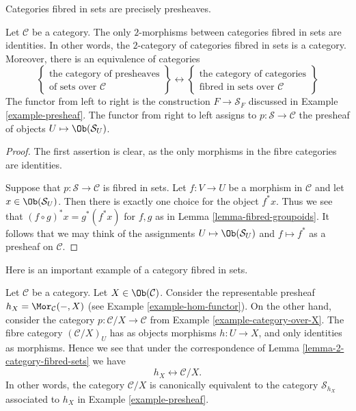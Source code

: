 \begin{lemma}
\label{lemma-2-category-fibred-sets}
\begin{slogan}
Categories fibred in sets are precisely presheaves.
\end{slogan}
Let $\mathcal{C}$ be a category.
The only $2$-morphisms between categories fibred in sets are identities.
In other words, the $2$-category of categories fibred in sets is a category.
Moreover, there is an equivalence of categories
$$
\left\{
\begin{matrix}
\text{the category of presheaves}\\
\text{of sets over }\mathcal{C}
\end{matrix}
\right\}
\leftrightarrow
\left\{
\begin{matrix}
\text{the category of categories}\\
\text{fibred in sets over }\mathcal{C}
\end{matrix}
\right\}
$$
The functor from left to right is the construction
$F \to \mathcal{S}_F$ discussed in
Example \ref{example-presheaf}.
The functor from right to left assigns to $p : \mathcal{S} \to \mathcal{C}$
the presheaf of objects $U \mapsto \Ob(\mathcal{S}_U)$.
\end{lemma}

\begin{proof}
The first assertion is clear, as the only morphisms in the fibre
categories are identities.

\medskip\noindent
Suppose that $p :
\mathcal{S} \to \mathcal{C}$ is fibred in sets. Let $f : V \to U$
be a morphism in $\mathcal{C}$ and let $x \in \Ob(\mathcal{S}_U)$.
Then there is exactly one choice for the object $f^\ast x$. Thus we see that
$(f \circ g)^\ast x = g^\ast(f^\ast x)$ for $f, g$ as in Lemma
\ref{lemma-fibred-groupoids}. It follows that we may think of the
assignments $U \mapsto \Ob(\mathcal{S}_U)$ and $f \mapsto f^\ast$
as a presheaf on $\mathcal{C}$.
\end{proof}

\noindent
Here is an important example of a category fibred in sets.

\begin{example}
\label{example-fibred-category-from-functor-of-points}
Let $\mathcal{C}$ be a category. Let $X \in \Ob(\mathcal{C})$.
Consider the representable presheaf $h_X = \Mor_\mathcal{C}(-, X)$
(see Example \ref{example-hom-functor}).
On the other hand, consider the category $p : \mathcal{C}/X \to \mathcal{C}$
from Example \ref{example-category-over-X}.
The fibre category $(\mathcal{C}/X)_U$ has as objects morphisms
$h : U \to X$, and only identities as morphisms. Hence we see that
under the correspondence of
Lemma \ref{lemma-2-category-fibred-sets}
we have
$$
h_X \longleftrightarrow \mathcal{C}/X.
$$
In other words, the category $\mathcal{C}/X$ is canonically equivalent
to the category $\mathcal{S}_{h_X}$ associated
to $h_X$ in
Example \ref{example-presheaf}.
\end{example}


